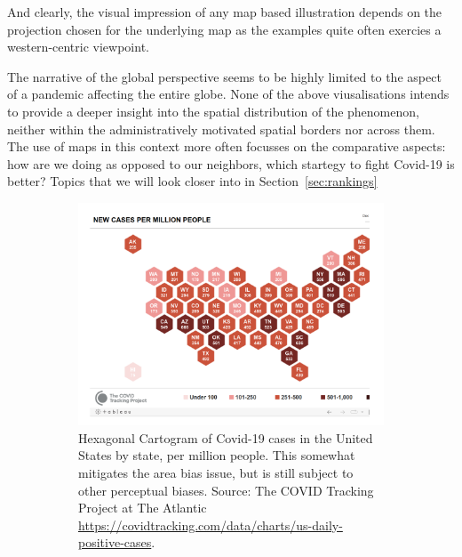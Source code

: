 \documentclass[article]{jdssv}\usepackage[]{graphicx}\usepackage[]{color}
\begin{document}
And clearly, the visual impression of any map based illustration depends on the projection chosen for the underlying map as the examples quite often exercies a western-centric viewpoint.

The narrative of the global perspective seems to be highly limited to the aspect of a pandemic affecting the entire globe. None of the above viusalisations intends to provide a deeper insight into the spatial distribution of the phenomenon, neither within the administratively motivated spatial borders nor across them. The use of maps in this context more often focusses on the comparative aspects: how are we doing as opposed to our neighbors, which startegy to fight Covid-19 is better? Topics that we will look closer into in Section~\ref{sec:rankings}

\begin{figure}
\centering
\begin{subfigure}[t]{.45\textwidth}
\includegraphics[width=\textwidth]{covid-tracking-hex-cartogram}
\caption{Hexagonal Cartogram of Covid-19 cases in the United States by state, per million people. This somewhat mitigates the area bias issue, but is still subject to other perceptual biases. Source: The COVID Tracking Project at The Atlantic \url{https://covidtracking.com/data/charts/us-daily-positive-cases}.}\label{fig:hex-cartogram}
\end{subfigure}\hfill
\begin{subfigure}[t]{.45\textwidth}

\end{subfigure}
\end{figure}
\end{document}
